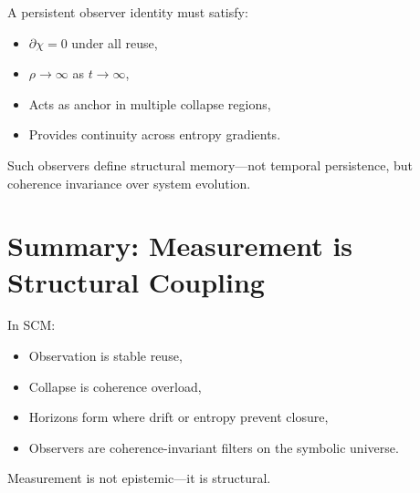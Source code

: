 A persistent observer identity must satisfy:
\begin{itemize}
  \item $\partial\chi = 0$ under all reuse,
  \item $\rho \to \infty$ as $t \to \infty$,
  \item Acts as anchor in multiple collapse regions,
  \item Provides continuity across entropy gradients.
\end{itemize}

Such observers define structural memory—not temporal persistence, but coherence invariance over system evolution.

\section{Summary: Measurement is Structural Coupling} \label{sec:measurement-summary}

In SCM:
\begin{itemize}
  \item Observation is stable reuse,
  \item Collapse is coherence overload,
  \item Horizons form where drift or entropy prevent closure,
  \item Observers are coherence-invariant filters on the symbolic universe.
\end{itemize}

Measurement is not epistemic—it is structural.
